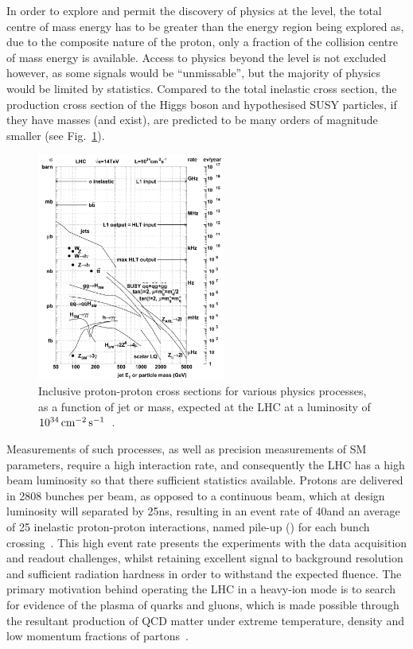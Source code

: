 In order to explore and permit the discovery of physics at the \TeV level, the total centre of mass energy has to be greater than the energy region being explored as, due to the composite nature of the proton, only a fraction of the collision centre of mass energy is available.
Access to physics beyond the \TeV level is not excluded	however, as some signals would be ``unmissable'', but the majority of physics would be limited by statistics.
Compared to the total inelastic cross section, the production cross section of the Higgs boson and hypothesised SUSY particles, if they have \TeV masses (and exist), are predicted to be many orders of magnitude smaller (see Fig.~\ref{fig:crossSections}).

\begin{figure}[htbp]
\begin{center}
\includegraphics[width=0.55\textwidth]{figs/cms/crossSections.pdf}
\caption{Inclusive proton-proton cross sections for various physics processes, as a function of jet \ET or mass, expected at the LHC at a luminosity of $10^{34}\,\text{cm}^\text{$-$2}\,\text{s}^\text{$-$1}$~\cite{Dasu:2000ge}.}
\label{fig:crossSections}
\end{center}
\end{figure}

Measurements of such processes, as well as precision measurements of SM parameters, require a high interaction rate, and consequently the LHC has a high beam luminosity so that there sufficient statistics available.
Protons are delivered in 2808 bunches per beam, as opposed to a continuous beam, which at design luminosity will separated by 25ns, resulting in an event rate of 40\MHz and an average of 25 inelastic proton-proton interactions, named pile-up (\PU) for each bunch crossing~\cite{Bruning:782076,Ball:2007zza}. 
This high event rate presents the experiments with the data acquisition and readout challenges, whilst retaining excellent signal to background resolution and sufficient radiation hardness in order to withstand the expected fluence.
The primary motivation behind operating the LHC in a heavy-ion mode is to search for evidence of the plasma of quarks and gluons, which is made possible through the resultant production of QCD matter under extreme temperature, density and low momentum fractions of partons~\cite{Baur:687318}.


